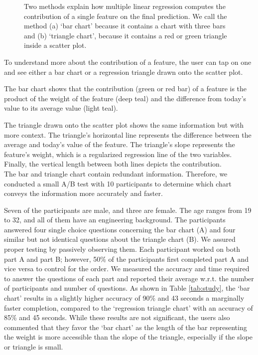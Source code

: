 \documentclass[conference]{IEEEtran}
\begin{document}
\begin{figure}[htbp]
    \caption{Two methods explain how multiple linear regression computes the contribution of a single feature on the final prediction. We call the method (a) `bar chart' because it contains a chart with three bars and (b) `triangle chart', because it contains a red or green triangle inside a scatter plot.}
    \label{fig:explain}
\end{figure}

To understand more about the contribution of a feature, the user can tap on one and see either a bar chart or a regression triangle drawn onto the scatter plot.

The bar chart shows that the contribution (green or red bar) of a feature is the product of the weight of the feature (deep teal) and the difference from today's value to its average value (light teal). 

The triangle drawn onto the scatter plot shows the same information but with more context. 
The triangle's horizontal line represents the difference between the average and today's value of the feature. The triangle's slope represents the feature's weight, which is a regularized regression line of the two variables. Finally, the vertical length between both lines depicts the contribution.\\

The bar and triangle chart contain redundant information. Therefore, we conducted a small A/B test with 10 participants to determine which chart conveys the information more accurately and faster. 

Seven of the participants are male, and three are female. The age ranges from 19 to 32, and all of them have an engineering background. 
The participants answered four single choice questions concerning the bar chart (A) and four similar but not identical questions about the triangle chart (B). We assured proper testing by passively observing them. Each participant worked on both part A and part B; however, 50\% of the participants first completed part A and vice versa to control for the order. We measured the accuracy and time required to answer the questions of each part and reported their average w.r.t. the number of participants and number of questions. As shown in Table \ref{tab:study}, the `bar chart' results in a slightly higher accuracy of 90\% and 43 seconds a marginally faster completion, compared to the `regression triangle chart' with an accuracy of 85\% and 45 seconds.
While these results are not significant, the users also commented that they favor the `bar chart' as the length of the bar representing the weight is more accessible than the slope of the triangle, especially if the slope or triangle is small.
\end{document}
